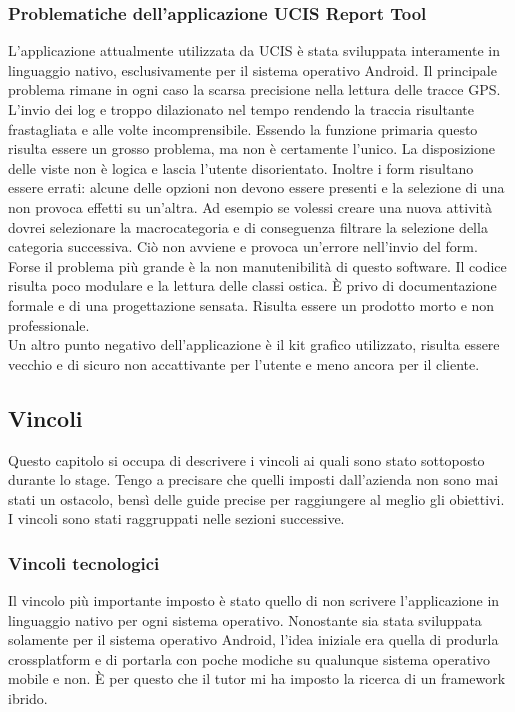 \subsubsection{Problematiche dell'applicazione UCIS Report Tool}
L'applicazione attualmente utilizzata da UCIS è stata sviluppata interamente in linguaggio nativo, esclusivamente per il
sistema operativo \gls{Android}. Il principale problema rimane in ogni caso la scarsa precisione nella lettura delle
tracce GPS. L'invio dei log e troppo dilazionato nel tempo rendendo la traccia risultante frastagliata e alle volte
incomprensibile. Essendo la funzione primaria questo risulta essere un grosso problema, ma non è certamente l'unico. La
disposizione delle viste non è logica e lascia l'utente disorientato. Inoltre i form risultano essere errati: alcune
delle opzioni non devono essere presenti e la selezione di una non provoca effetti su un'altra. Ad esempio se volessi
creare una nuova attività dovrei selezionare la macrocategoria e di conseguenza filtrare la selezione della categoria
successiva. Ciò non avviene e provoca un'errore nell'invio del form. \\
\noindent Forse il problema più grande è la non manutenibilità di questo software. Il codice risulta poco modulare e la
lettura delle classi ostica. È privo di documentazione formale e di una progettazione sensata. Risulta essere un
prodotto morto e non professionale. \\
\noindent Un altro punto negativo dell'applicazione è il kit grafico utilizzato, risulta essere vecchio e di sicuro non
accattivante per l'utente e meno ancora per il cliente.


\subsection{Vincoli}

Questo capitolo si occupa di descrivere i vincoli ai quali sono stato sottoposto durante lo stage. Tengo a precisare che quelli imposti dall'azienda non sono mai stati un ostacolo, bensì delle guide precise per raggiungere al meglio gli obiettivi. I vincoli sono stati raggruppati nelle sezioni successive.

\subsubsection{Vincoli tecnologici}
Il vincolo più importante imposto è stato quello di non scrivere l'applicazione in linguaggio nativo per ogni sistema operativo. Nonostante
sia stata sviluppata solamente per il sistema operativo Android, l'idea iniziale era quella di produrla \gls{crossplatform} e di portarla con
poche modiche su qualunque sistema operativo mobile e non. È per questo che il tutor mi ha imposto la ricerca di un framework ibrido.

